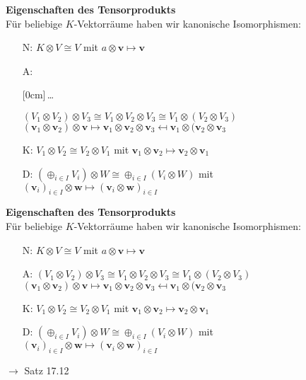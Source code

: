 \documentclass[11pt]{article}
\renewcommand{\cite}[1]{\par\bigskip\hfill{\color{gray}\tiny\(\to\) #1}}
\renewcommand{\vec}[1]{\mathbf{#1}}
\newcommand{\hide}[1]{\parbox{0cm}{\raisebox{-7pt}[0cm]{\dots}}\color{white}#1\color{black}}
\let\olddots\dots
\renewcommand{\dots}{\,\olddots\,}
\newenvironment{field}{}{\newpage}
\newif\ifnote
\newenvironment{note}{\notetrue}{\notefalse}
\begin{document}
\begin{note}
    \begin{field}
        \textbf{Eigenschaften des Tensorprodukts}\\
        Für beliebige $K$-Vektorräume haben wir kanonische Isomorphismen:
        \begin{itemize}
            \item[N:] $K\otimes V \cong V$ mit $a\otimes \vec{v} \mapsto \vec{v}$
            \item[A:] \hide{$(V_1\otimes V_2)\otimes V_3 \cong V_1\otimes V_2 \otimes V_3 \cong V_1\otimes (V_2\otimes V_3)$\\
            $(\vec{v}_1\otimes\vec{v}_2)\otimes\vec{v} \mapsto \vec{v}_1\otimes\vec{v}_2\otimes\vec{v}_3 \mapsfrom \vec{v}_1\otimes(\vec{v}_2\otimes\vec{v}_3$}
            \item[K:] $V_1\otimes V_2 \cong V_2\otimes V_1$ mit
            $\vec{v}_1\otimes\vec{v}_2 \mapsto \vec{v}_2\otimes\vec{v}_1$
            \item[D:] $(\oplus_{i\in I} V_i)\otimes W \cong \oplus_{i\in I}(V_i\otimes W)$ mit \\
            $(\vec{v}_i)_{i\in I}\otimes \vec{w} \mapsto (\vec{v}_i\otimes \vec{w})_{i\in I}$
        \end{itemize}
    \end{field}
    \begin{field}
        \textbf{Eigenschaften des Tensorprodukts}\\
        Für beliebige $K$-Vektorräume haben wir kanonische Isomorphismen:
        \begin{itemize}
            \item[N:] $K\otimes V \cong V$ mit $a\otimes \vec{v} \mapsto \vec{v}$
            \item[A:] $(V_1\otimes V_2)\otimes V_3 \cong V_1\otimes V_2 \otimes V_3 \cong V_1\otimes (V_2\otimes V_3)$\\
            $(\vec{v}_1\otimes\vec{v}_2)\otimes\vec{v} \mapsto \vec{v}_1\otimes\vec{v}_2\otimes\vec{v}_3 \mapsfrom \vec{v}_1\otimes(\vec{v}_2\otimes\vec{v}_3$
            \item[K:] $V_1\otimes V_2 \cong V_2\otimes V_1$ mit
            $\vec{v}_1\otimes\vec{v}_2 \mapsto \vec{v}_2\otimes\vec{v}_1$
            \item[D:] $(\oplus_{i\in I} V_i)\otimes W \cong \oplus_{i\in I}(V_i\otimes W)$ mit \\
            $(\vec{v}_i)_{i\in I}\otimes \vec{w} \mapsto (\vec{v}_i\otimes \vec{w})_{i\in I}$
        \end{itemize}
        \cite{Satz 17.12}
    \end{field}


\end{note}
\end{document}
